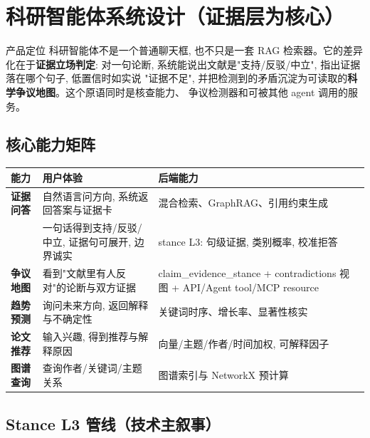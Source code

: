 \section{科研智能体系统设计（证据层为核心）}

\begin{designbox}{产品定位}
科研智能体不是一个普通聊天框, 也不只是一套 RAG 检索器。它的差异化在于\textbf{证据立场判定}:
对一句论断, 系统能说出文献是"支持/反驳/中立", 指出证据落在哪个句子, 低置信时如实说
"证据不足", 并把检测到的矛盾沉淀为可读取的\textbf{科学争议地图}。这个原语同时是核查能力、
争议检测器和可被其他 agent 调用的服务。
\end{designbox}

\subsection{核心能力矩阵}

\begin{center}
\begin{tabularx}{\textwidth}{>{\bfseries}p{30mm}X X}
\toprule
能力 & 用户体验 & 后端能力 \\
\midrule
证据问答 & 自然语言问方向, 系统返回答案与证据卡 & 混合检索、GraphRAG、引用约束生成 \\
\multicolumn{1}{l}{\textbf{论断核查}} & \multicolumn{1}{l}{一句话得到支持/反驳/中立, 证据句可展开, 边界诚实} & \multicolumn{1}{l}{stance L3: 句级证据, 类别概率, 校准拒答}\\
争议地图 & 看到"文献里有人反对"的论断与双方证据 & claim\_evidence\_stance + contradictions 视图 + API/Agent tool/MCP resource \\
趋势预测 & 询问未来方向, 返回解释与不确定性 & 关键词时序、增长率、显著性核实 \\
论文推荐 & 输入兴趣, 得到推荐与解释原因 & 向量/主题/作者/时间加权, 可解释因子 \\
图谱查询 & 查询作者/关键词/主题关系 & 图谱索引与 NetworkX 预计算 \\
\bottomrule
\end{tabularx}
\end{center}

\subsection{Stance L3 管线（技术主叙事）}

